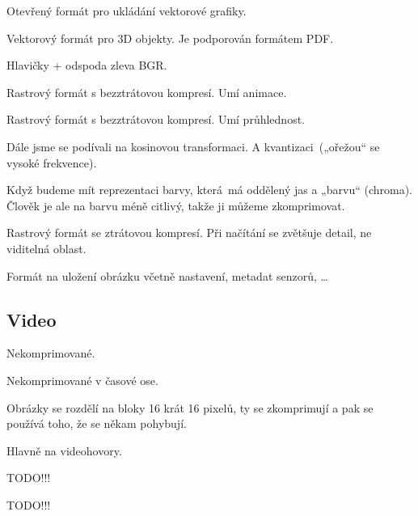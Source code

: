 \documentclass[12pt]{article}					%
\begin{document}
\begin{definice}[SVG]
	Otevřený formát pro ukládání vektorové grafiky.
\end{definice}

\begin{definice}[Universal 3D (U3D)]
	Vektorový formát pro 3D objekty. Je podporován formátem PDF.
\end{definice}

\begin{definice}
	Hlavičky + odspoda zleva BGR.
\end{definice}

\begin{definice}[GIF]
	Rastrový formát s bezztrátovou kompresí. Umí animace.
\end{definice}

\begin{definice}[PNG]
	Rastrový formát s bezztrátovou kompresí. Umí průhlednost.
\end{definice}

\begin{poznamka}
	Dále jsme se podívali na kosinovou transformaci. A kvantizaci („ořežou“ se vysoké frekvence).
\end{poznamka}

\begin{definice}
	Když budeme mít reprezentaci barvy, která má oddělený jas a „barvu“ (chroma). Člověk je ale na barvu méně citlivý, takže ji můžeme zkomprimovat.
\end{definice}

\begin{definice}[JPEG]
	Rastrový formát se ztrátovou kompresí. Při načítání se zvětšuje detail, ne viditelná oblast.
\end{definice}

\begin{definice}[RAW]
	Formát na uložení obrázku včetně nastavení, metadat senzorů, …
\end{definice}

\subsection{Video}
\begin{definice}[R210]
	Nekomprimované.
\end{definice}

\begin{definice}
	Nekomprimované v časové ose.
\end{definice}

\begin{definice}
	Obrázky se rozdělí na bloky 16 krát 16 pixelů, ty se zkomprimují a pak se používá toho, že se někam pohybují.
\end{definice}

\begin{definice}[H.261]
	Hlavně na videohovory.
\end{definice}

\begin{definice}
	TODO!!!
\end{definice}

TODO!!!
\end{document}

